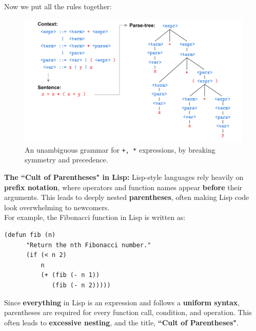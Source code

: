 \noindent
Now we put all the rules together:
\begin{figure}[h]
    \centering
    \includegraphics[width=1\textwidth]{Sections/Formal/amb6.png}
    \caption{An unambiguous grammar for \texttt{+, *} expressions, by breaking symmetry and precedence.}
    \label{fig:amb6}
\end{figure}

\begin{Tip} \textbf{The ``Cult of Parentheses" in Lisp:} Lisp-style languages rely heavily on \textbf{prefix notation}, where operators and function names appear \textbf{before} their arguments. This leads to deeply nested \textbf{parentheses}, often making Lisp code look overwhelming to newcomers.\\
    
    \noindent
    For example, the Fibonacci function in Lisp is written as:
    
    \begin{lstlisting}[numbers=none]
    (defun fib (n)
      "Return the nth Fibonacci number."
      (if (< n 2)
          n
          (+ (fib (- n 1))
             (fib (- n 2)))))
    \end{lstlisting}
    
    \noindent
    Since \textbf{everything} in Lisp is an expression and follows a \textbf{uniform syntax}, parentheses are required for every function call, condition, and operation. This often leads to \textbf{excessive nesting}, and the title, \textbf{``Cult of Parentheses"}.
    
    \end{Tip}
    
    